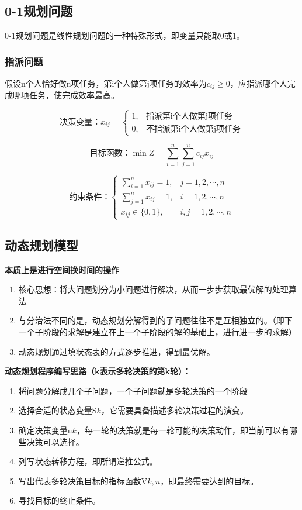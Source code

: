 \documentclass[12pt,a4paper]{article}
\begin{document}
\subsection{0-1规划问题}
0-1规划问题是线性规划问题的一种特殊形式，即变量只能取0或1。
\subsubsection{指派问题}
假设n个人恰好做n项任务，第i个人做第j项任务的效率为$c_{ij} \geq 0$，应指派哪个人完成哪项任务，使完成效率最高。

$$
\text{决策变量：} x_{ij} = 
\begin{cases}
    1, & \text{指派第i个人做第j项任务} \\
    0, & \text{不指派第i个人做第j项任务}
\end{cases}
$$

$$
\text{目标函数：} \min Z = \sum_{i=1}^n \sum_{j=1}^n c_{ij} x_{ij}
$$

$$
\text{约束条件：}
\begin{cases}
    \sum\limits_{i=1}^n x_{ij} = 1, & j = 1,2,\cdots,n \\
    \sum\limits_{j=1}^n x_{ij} = 1, & i = 1,2,\cdots,n \\
    x_{ij} \in \{0,1\}, & i,j = 1,2,\cdots,n
\end{cases}
$$

\subsection{动态规划模型}
\textbf{本质上是进行空间换时间的操作}
\begin{enumerate}[1)]
    \item 核心思想：将大问题划分为小问题进行解决，从而一步步获取最优解的处理算法
    \item 与分治法不同的是，动态规划分解得到的子问题往往不是互相独立的。（即下一个子阶段的求解是建立在上一个子阶段的解的基础上，进行进一步的求解）
    \item 动态规划通过填状态表的方式逐步推进，得到最优解。
\end{enumerate}


\textbf{动态规划程序编写思路（k表示多轮决策的第k轮）：}
\begin{enumerate}[1.]
    \item 将问题分解成几个子问题，一个子问题就是多轮决策的一个阶段
    \item 选择合适的状态变量S\(k\)，它需要具备描述多轮决策过程的演变。
    \item 确定决策变量u\(k\)，每一轮的决策就是每一轮可能的决策动作，即当前可以有哪些决策可以选择。
    \item 列写状态转移方程，即所谓递推公式。
    \item 写出代表多轮决策目标的指标函数V\(k,n\)，即最终需要达到的目标。
    \item 寻找目标的终止条件。
\end{enumerate}
\end{document}
